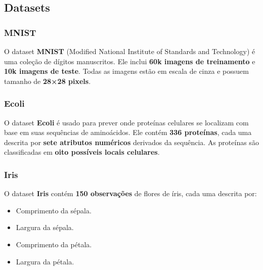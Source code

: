 \documentclass{article}
\begin{document}
%
%
\subsection{Datasets}

\subsubsection{MNIST}

O dataset \textbf{MNIST} (Modified National Institute of Standards and Technology) é uma coleção de dígitos manuscritos. Ele inclui \textbf{60k imagens de treinamento} e \textbf{10k imagens de teste}. Todas as imagens estão em escala de cinza e possuem tamanho de \textbf{28×28 pixels}.

\subsubsection{Ecoli}

O dataset \textbf{Ecoli} é usado para prever onde proteínas celulares se localizam com base em suas sequências de aminoácidos. Ele contém \textbf{336 proteínas}, cada uma descrita por \textbf{sete atributos numéricos} derivados da sequência. As proteínas são classificadas em \textbf{oito possíveis locais celulares}.

\subsubsection{Iris}

O dataset \textbf{Iris} contém \textbf{150 observações} de flores de íris, cada uma descrita por:

\begin{itemize}
    \item Comprimento da sépala.
    \item Largura da sépala.
    \item Comprimento da pétala.
    \item Largura da pétala.
\end{itemize}
\end{document}
